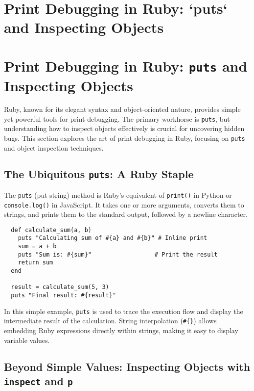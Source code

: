 \documentclass{article}
\begin{document}
{{{{%
\newpage

\section*{Print Debugging in Ruby: `puts` and Inspecting Objects} %
\label{chapter-9-7-Print_Debugging_in_Ruby___puts__and_Insp}

\section*{Print Debugging in Ruby: \texttt{puts} and Inspecting Objects}

Ruby, known for its elegant syntax and object-oriented nature, provides simple yet powerful tools for print debugging. The primary workhorse is \texttt{puts}, but understanding how to inspect objects effectively is crucial for uncovering hidden bugs. This section explores the art of print debugging in Ruby, focusing on \texttt{puts} and object inspection techniques.

\subsection*{The Ubiquitous \texttt{puts}: A Ruby Staple}

The \texttt{puts} (put string) method is Ruby's equivalent of \texttt{print()} in Python or \texttt{console.log()} in JavaScript. It takes one or more arguments, converts them to strings, and prints them to the standard output, followed by a newline character.

\begin{verbatim}
  def calculate_sum(a, b)
    puts "Calculating sum of #{a} and #{b}" # Inline print
    sum = a + b
    puts "Sum is: #{sum}"                  # Print the result
    return sum
  end

  result = calculate_sum(5, 3)
  puts "Final result: #{result}"
\end{verbatim}

In this simple example, \texttt{puts} is used to trace the execution flow and display the intermediate result of the calculation.  String interpolation (\texttt{\#\{\}}) allows embedding Ruby expressions directly within strings, making it easy to display variable values.

\subsection*{Beyond Simple Values: Inspecting Objects with \texttt{inspect} and \texttt{p}}

}}}}
\end{document}
